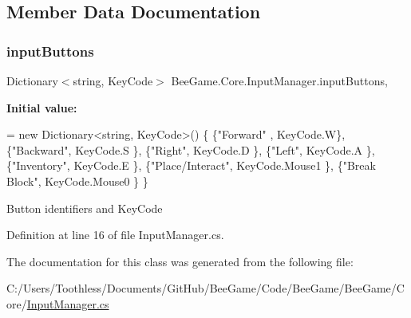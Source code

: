 \subsection{Member Data Documentation}
\mbox{\label{class_bee_game_1_1_core_1_1_input_manager_ad0a5b4a5db00803c01ecb3431e208ca1}} 
\subsubsection{\texorpdfstring{input\+Buttons}{inputButtons}}
{\footnotesize\ttfamily Dictionary$<$string, Key\+Code$>$ Bee\+Game.\+Core.\+Input\+Manager.\+input\+Buttons\hspace{0.3cm}{\ttfamily [static]}, {\ttfamily [private]}}

{\bfseries Initial value\+:}
\begin{DoxyCode}
= \textcolor{keyword}{new} Dictionary<string, KeyCode>()
        \{
            \{\textcolor{stringliteral}{"Forward"} , KeyCode.W\},
            \{\textcolor{stringliteral}{"Backward"}, KeyCode.S \},
            \{\textcolor{stringliteral}{"Right"}, KeyCode.D \},
            \{\textcolor{stringliteral}{"Left"}, KeyCode.A \},
            \{\textcolor{stringliteral}{"Inventory"}, KeyCode.E \},
            \{\textcolor{stringliteral}{"Place/Interact"}, KeyCode.Mouse1 \},
            \{\textcolor{stringliteral}{"Break Block"}, KeyCode.Mouse0 \}
        \}
\end{DoxyCode}


Button identifiers and Key\+Code 



Definition at line 16 of file Input\+Manager.\+cs.



The documentation for this class was generated from the following file\+:\begin{DoxyCompactItemize}
\item 
C\+:/\+Users/\+Toothless/\+Documents/\+Git\+Hub/\+Bee\+Game/\+Code/\+Bee\+Game/\+Bee\+Game/\+Core/\hyperlink{_input_manager_8cs}{Input\+Manager.\+cs}\end{DoxyCompactItemize}
